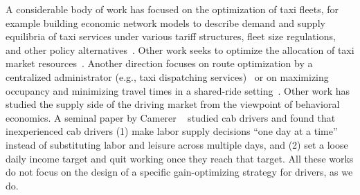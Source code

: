 A considerable body of work has focused on the optimization of taxi fleets, for
example building economic network models to describe demand and supply equilibria of taxi 
services under various tariff structures, fleet size regulations, and other policy
alternatives~\cite{bailey1987simulation,yang2002demand}.  Other work seeks to 
 optimize the allocation of taxi market resources~\cite{shi2016optimization}.
Another direction focuses on route optimization by a centralized administrator (e.g., taxi dispatching services)~\cite{maciejewski2013simulation,nunes2011taxi} 
or on maximizing occupancy and minimizing travel times 
in a shared-ride setting~\cite{jung2013design}.
Other work has studied the supply side of the driving market from the viewpoint of behavioral economics.
A seminal paper by Camerer {\etal}~\cite{camerer1997labor} studied cab drivers and found that  inexperienced
cab drivers (1) make labor supply decisions ``one day at a time'' instead of substituting labor and leisure across multiple days, and  (2) set a loose daily income target and quit working once they reach that target.  
All these works do not focus on the design of a specific gain-optimizing
strategy for drivers, as we do.


